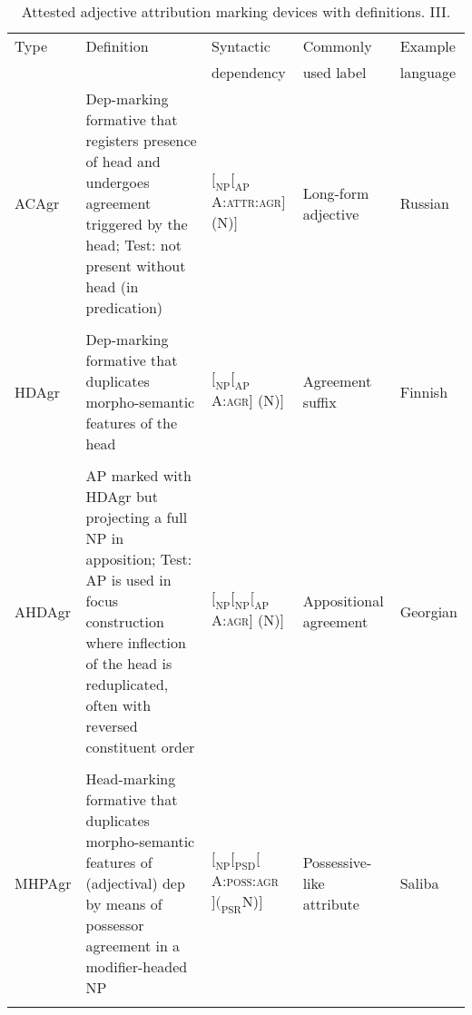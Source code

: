 \begin{sidewaystable}
\begin{tabularx}{\columnwidth}{l X l p{3.2cm} l}
\lsptoprule
Type	&Definition&Syntactic&Commonly&Example\\
	&		&dependency&used label&language\\
\midrule
ACAgr	&Dep-marking formative that registers presence of head and undergoes agreement triggered by the head; Test: not present without head (in predication)&$[_\textrm{NP}[_\textrm{AP}$ A\textsc{:attr:agr}$]$ (N)$]$
		&Long-form adjective	&Russian\il{Russian}\\
\\
HDAgr	&Dep-marking formative that duplicates morpho-semantic features of the head&$[_\textrm{NP}[_\textrm{AP}$ A:\textsc{agr}$]$ (N)$]$
		&Agreement suffix		&Finnish\il{Finnish}\\
\\
AHDAgr	&AP marked with HDAgr but projecting a full NP in apposition; Test: AP is used in focus construction where inflection of the head is reduplicated, often with reversed constituent order&$[_\textrm{NP}[_\textrm{NP}[_\textrm{AP}$ A\textsc{:agr}$]$ (N)$]$
		&Appositional agreement	&Georgian\il{Georgian}\\
\\
MHPAgr	&Head-marking formative that duplicates morpho-semantic features of (adjectival) dep by means of possessor agreement in a modifier\hyp{}headed NP&$[_\textrm{NP}[_\textrm{PSD}[$ A:\textsc{poss:agr}$](_\textrm{PSR}$N)$]$
		&Possessive-like attribute&Saliba\il{Saliba}\\
\lspbottomrule
\end{tabularx}
\caption[Ontology: Definitions III]{Attested adjective attribution marking devices with definitions. III.}\label{tabledefontology3}
\end{sidewaystable}

